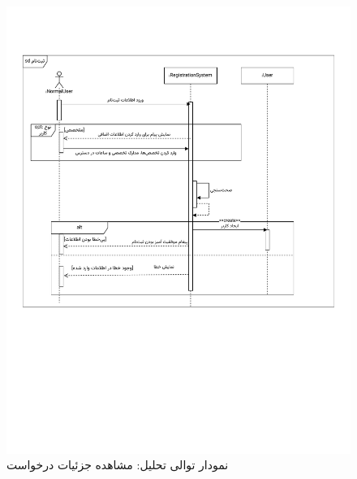 \begin{figure}[ht!]
	\centering
	\includegraphics[scale=0.8, page=11]{figs/OOD-Sequence-1.pdf}
	\caption{نمودار توالی تحلیل: مشاهده جزئیات درخواست}
\end{figure}
\FloatBarrier
\newpage

